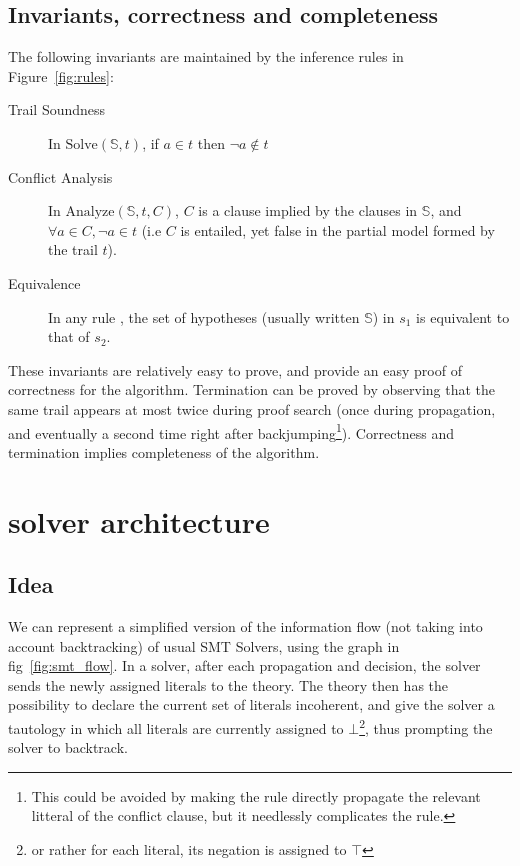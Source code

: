 \documentclass{article}
\begin{document}
\subsection{Invariants, correctness and completeness}

The following invariants are maintained by the inference rules in Figure~\ref{fig:rules}:
\begin{description}
  \item[Trail Soundness] In $\text{Solve}(\mathbb{S}, t)$, if $a \in t$ then $\neg a \notin t$
  \item[Conflict Analysis] In $\text{Analyze}(\mathbb{S}, t, C)$, $C$ is a clause implied by the
    clauses in $\mathbb{S}$, and $\forall a \in C, \neg a \in t$ (i.e $C$ is entailed, yet false
    in the partial model formed by the trail $t$).
  \item[Equivalence] In any rule \DP{}, the set of hypotheses
    (usually written $\mathbb{S}$) in $s_1$ is equivalent to that of $s_2$.
\end{description}

These invariants are relatively easy to prove, and provide an easy proof of correctness for
the \sat{} algorithm. Termination can be proved by observing that the same trail appears
at most twice during proof search (once during propagation, and eventually a second time
right after backjumping\footnote{This could be avoided by making the  rule
directly propagate the relevant litteral of the conflict clause, but it needlessly
complicates the rule.}). Correctness and termination implies completeness of the \sat{}
algorithm.


\section{\smt{} solver architecture}

\subsection{Idea}

We can represent a simplified version of the information flow (not taking into
account backtracking) of usual SMT Solvers, using the graph in fig~\ref{fig:smt_flow}.
In a \smt{} solver, after each propagation and decision, the solver sends the newly
assigned literals to the theory. The theory then has the possibility to declare the
current set of literals incoherent, and give the solver a tautology in which all
literals are currently assigned to $\bot$\footnote{or rather for each literal, its negation
is assigned to $\top$}, thus prompting the solver to backtrack.
\end{document}
